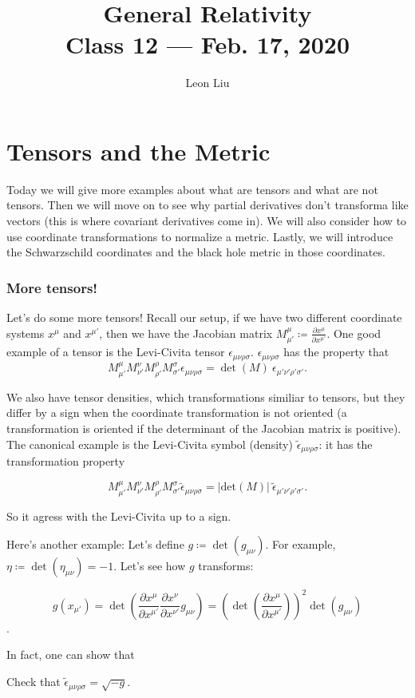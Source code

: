 \documentclass[10pt]{article}
\title{{\Huge General Relativity}\\{\Large{Class 12 --- Feb. 17, 2020}}} %
\author{Leon Liu}
\newcommand{\xm}{x^\mu}
\newcommand{\xmp}{x^{\mu'}}
\newcommand{\xn}{x^\nu}
\newcommand{\xnp}{x^{\nu'}}
\newcommand{\epu}{\epsilon_{\mu \nu \rho \sigma}}
\newcommand{\epup}{\epsilon_{\mu' \nu' \rho' \sigma'}}
\newcommand{\eput}{\tilde{\epsilon}_{\mu \nu \rho \sigma}}
\newcommand{\epupt}{\tilde{\epsilon}_{\mu' \nu' \rho' \sigma'}}
\newcommand{\gmn}{g_{\mu \nu}}
\newcommand{\dxm}{\frac {\partial \xm}{\partial \xmp}}
\newcommand{\dxn}{\frac {\partial \xn}{\partial \xnp}}
\newcommand{\Det}{\text{det}}
\begin{document}
    \maketitle
    \flushbottom
    \newpage
    \pagestyle{fancynotes}
    \part{Tensors and the Metric}

Today we will give more examples about what are tensors and what are not tensors. Then we will move on to see why partial derivatives don't transforma like vectors (this is where covariant derivatives come in). We will also consider how to use coordinate transformations to normalize a metric. Lastly, we will introduce the Schwarzschild coordinates and the black hole metric in those coordinates.

    

\section{More tensors!}\label{sec:class_style}


Let's do some more tensors! Recall our setup, if we have two different coordinate systems $x^\mu$ and $\xmp$, then we have the Jacobian matrix $M^\mu _{\mu'} \coloneqq \frac {\partial \xm}{\partial \xmp}$. One good example of a tensor is the Levi-Civita tensor $\epu$. $\epu$ has the property that $$M^{\mu}_{\mu'} M^{\nu}_{\nu'} M^{\rho}_{\rho'} M^{\sigma}_{\sigma'} \epu = \det (M) \  \epup.$$


We also have tensor densities, which transformations similiar to tensors, but they differ by a sign when the coordinate transformation is not oriented (a transformation is oriented if the determinant of the Jacobian matrix is positive). The canonical example is the Levi-Civita symbol (density) $\eput$: it has the transformation property 

$$M^{\mu}_{\mu'} M^{\nu}_{\nu'} M^{\rho}_{\rho'} M^{\sigma}_{\sigma'} \eput = |\Det (M)| \  \epupt.$$

So it agress with the Levi-Civita up to a sign. 

Here's another example: Let's define $g \coloneqq \det (\gmn)$. For example, $\eta \coloneqq \det(\eta_{\mu \nu}) = -1$. Let's see how $g$ transforms:

$$g(x_{\mu'}) = \det( \frac {\partial \xm}{\partial \xmp} \dxn \gmn) 
	 = (\det (\dxm))^2 \det(\gmn)$$.  

In fact, one can show that
\begin{exercise}

Check that $\eput = \sqrt{-g}$.

\end{exercise}
\end{document}
